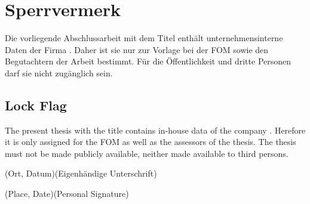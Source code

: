 \chapter*{Sperrvermerk}
Die vorliegende Abschlussarbeit mit dem Titel \daTitel{} enthält unternehmensinterne Daten der Firma \daUnternehmen{}. Daher ist sie nur zur Vorlage bei der FOM sowie den Begutachtern der Arbeit bestimmt. Für die Öffentlichkeit und dritte Personen darf sie nicht zugänglich sein.

\section*{Lock Flag}
The present thesis with the title \daTitel{} contains in-house data of the company \daUnternehmen{}. Herefore it is only assigned for the FOM as well as the assessors of the thesis. The thesis must not be made publicly available, neither made available to third persons.
\vspace{2cm}

\noindent
(Ort, Datum)\hfill						(Eigenhändige Unterschrift)

\noindent
(Place, Date)\hfill						(Personal Signature)
